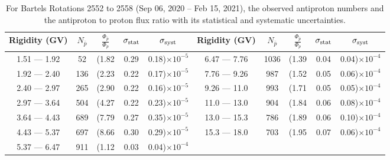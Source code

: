 \begin{table}[p] 
\renewcommand\baselinestretch{1.3}\selectfont
\setlength\tabcolsep{3pt}
\centering
\begin{tabular}{ccccc | ccccc}
\hline
\textbf{Rigidity}  (GV)  & $N_{\bar{p}}$ & $\frac{\Phi_{\bar{p}}}{\Phi_{p}}$ & $\sigma_{\rm{stat}}$ & $\sigma_{\rm{syst}}$ \hspace{1cm}   & \textbf{Rigidity}  (GV)  & $N_{\bar{p}}$ & $\frac{\Phi_{\bar{p}}}{\Phi_{p}}$ & $\sigma_{\rm{stat}}$ & $\sigma_{\rm{syst}}$ \hspace{1cm} \\ 
\hline
1.51 — 1.92   &  52                  &(1.82                          &  0.29              &      0.18)$\times 10^{-5}$  & 6.47 — 7.76                &  1036                  &(1.39                                &  0.04                   &      0.04)$\times 10^{-4}$\\
1.92 — 2.40   &  136                &(2.23                          &  0.22              &      0.17)$\times 10^{-5}$  & 7.76 — 9.26                &  987                    &(1.52                                &  0.05                   &      0.06)$\times 10^{-4}$\\
2.40 — 2.97   &  265                &(2.90                          &  0.22              &      0.16)$\times 10^{-5}$  & 9.26 — 11.0                &  993                    &(1.71                                &  0.05                   &      0.05)$\times 10^{-4}$\\    
2.97 — 3.64   &  504                &(4.27                          &  0.22              &      0.23)$\times 10^{-5}$  & 11.0 — 13.0                 &  904                    &(1.84                                &  0.06                   &      0.08)$\times 10^{-4}$\\    
3.64 — 4.43   &  689                &(7.79                          &  0.27              &      0.35)$\times 10^{-5}$  & 13.0 — 15.3               &  786                    &(1.89                                &  0.06                   &      0.10)$\times 10^{-4}$\\
4.43 — 5.37   &  697                &(8.66                          &  0.30              &      0.29)$\times 10^{-5}$  & 15.3 — 18.0               &  703                    &(1.95                                &  0.07                   &      0.06)$\times 10^{-4}$\\
5.37 — 6.47   &  911                &(1.12                          &  0.03              &      0.04)$\times 10^{-4}$  & \\
\hline
\end{tabular}
\caption[Antiproton to proton flux ratio for Bartels Rotations 2552 to 2558]{For Bartels Rotations 2552 to 2558 (Sep 06, 2020 – Feb 15, 2021), the observed antiproton numbers and the antiproton to proton flux ratio with its statistical and systematic uncertainties.}
\label{TableOfDependent22}
\end{table}


